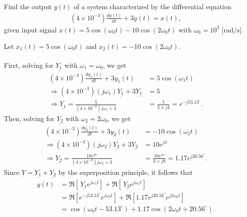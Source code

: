 \documentclass{report}
\begin{document}
\begin{example}
    Find the output $y(t)$ of a system characterized by the differential equation 
    \begin{align*}
        (4\times 10^{-3})\frac{dy(t)}{dt} + 3y(t) = x(t),
    \end{align*}
    given input signal $x(t) = 5\cos(\omega_0 t) - 10\cos(2\omega_0 t)$ with $\omega_0 = 10^3\text{ [rad/s]}$.
\end{example}
\begin{solution}
    Let $x_1(t) = 5\cos(\omega_0 t)$ and $x_2(t) = -10\cos(2\omega_0 t)$.
    \\ \\
    First, solving for $\underline{Y_1}$ with $\omega_1 = \omega_0$, we get 
    \begin{align*}
        (4\times 10^{-3})\frac{dy_1(t)}{dt} + 3y_1(t) &= 5\cos(\omega_1 t) \\
        \Longrightarrow (4\times 10^{-3})(j\omega_1)\underline{Y_1} + 3\underline{Y_1} &= 5 \\
        \Longrightarrow \underline{Y_1} = \frac{5}{(4\times 10^{-3})j\omega_1 + 3} &= \frac{5}{3+j4} = e^{-j53.13^{\circ}}.
    \end{align*}
    Then, solving for $\underline{Y_2}$ with $\omega_2 = 2\omega_0$, we get 
    \begin{align*}
        (4\times 10^{-3})\frac{dy_2(t)}{dt} + 3y_2(t) &= -10\cos(\omega_2 t) \\
        \Longrightarrow (4\times 10^{-3})(j\omega_2)\underline{Y_2} + 3\underline{Y_2} &= 10e^{j\pi} \\
        \Longrightarrow \underline{Y_2} = \frac{10e^{j\pi}}{(4\times 10^{-3})j\omega_2 + 3} &= \frac{10e^{j\pi}}{3+j8} = 1.17e^{j20.56^{\circ}}.
    \end{align*}
    Since $\underline{Y} = \underline{Y_1} + \underline{Y_2}$ by the superposition principle, it follows that 
    \begin{align*}
        y(t) &= \Re[\,\underline{Y_1}e^{j\omega_1 t}] + \Re[\,\underline{Y_2}e^{j\omega_2 t}] \\
        &= \Re[e^{-j53.13^{\circ}}e^{j\omega_0 t}] + \Re[1.17e^{j20.56^{\circ}}e^{j2\omega_0 t}] \\
        &= \cos(\omega_0 t - 53.13^{\circ}) + 1.17\cos(2\omega_0 t + 20.56^{\circ}).
    \end{align*}
\end{solution}
\end{document}
